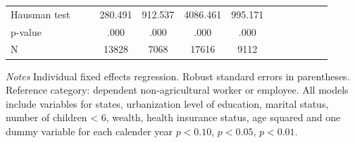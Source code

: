 \documentclass[12pt,english]{article}
\begin{document}
\begin{table}[p]
\begin{center}
\begin{adjustbox}{max width=\linewidth}
\begin{threeparttable}
{\begin{tabular}{l*{6}{S
S}}
Hausman test    &         &         &  280.491         &  912.537         & 4086.461         &  995.171         \\
\hspace*{10mm}p-value&         &         &     .000         &     .000         &     .000         &     .000         \\
N               &         &         &    13828         &     7068         &    17616         &     9112         \\
\bottomrule
\end{tabular}
\begin{tablenotes}
\item \footnotesize \textit{Notes} Individual fixed effects regression. Robust standard errors in parentheses. Reference category: dependent non-agricultural worker or employee. All models include variables for  states, urbanization level of education, marital status, number of children < 6, wealth, health insurance status, age squared and one dummy variable for each calender year \sym{*} \(p<0.10\), \sym{**} \(p<0.05\), \sym{***} \(p<0.01\).
\end{tablenotes}
}
\end{threeparttable}
\end{adjustbox}
\end{center}
\end{table} 
\end{document}
